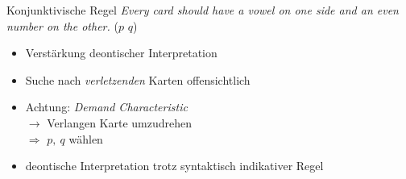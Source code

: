 \begin{frame}{Konjunktivische Regel {\scriptsize \cite[S.~99]{stenningHumanReasoningCognitive2008}}}
    \emph{Every card \alert{should} have a vowel on one side and an even number on the other.}
    ($p$ \raisebox{-0.25em}{$\stackrel{\to}{\sim}$} $q$)

    \begin{itemize}
        \item Verstärkung deontischer Interpretation
        \item Suche nach \emph{verletzenden} Karten offensichtlich
        \item Achtung: \emph{Demand Characteristic} \\
            $\to$ Verlangen Karte umzudrehen \\
            $\Rightarrow$ $p,~q$ wählen
        \item deontische Interpretation trotz syntaktisch indikativer Regel
    \end{itemize}
\end{frame}
